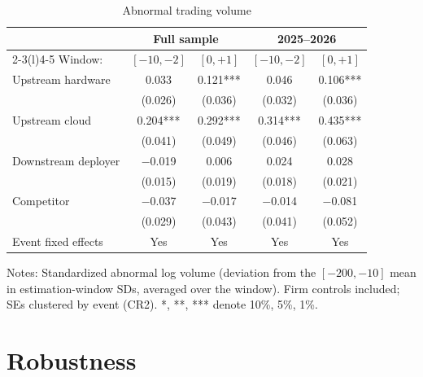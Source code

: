 \documentclass[review,12pt,authoryear]{elsarticle}
\begin{document}
\begin{table}[t!]
\centering
\begin{threeparttable}
\caption{Abnormal trading volume}\label{tab:volume}
\small
\begin{tabular}{lcc@{\hskip 2em}cc}
\toprule
 & \multicolumn{2}{c}{Full sample} & \multicolumn{2}{c}{2025--2026} \\
\cmidrule(lr){2-3}\cmidrule(l){4-5}
Window: & $[-10,-2]$ & $[0,+1]$ & $[-10,-2]$ & $[0,+1]$ \\
\midrule
Upstream hardware   & 0.033 & 0.121*** & 0.046 & 0.106*** \\
                    & (0.026) & (0.036) & (0.032) & (0.036) \\
Upstream cloud      & 0.204*** & 0.292*** & 0.314*** & 0.435*** \\
                    & (0.041) & (0.049) & (0.046) & (0.063) \\
Downstream deployer & $-$0.019 & 0.006 & 0.024 & 0.028 \\
                    & (0.015) & (0.019) & (0.018) & (0.021) \\
Competitor          & $-$0.037 & $-$0.017 & $-$0.014 & $-$0.081 \\
                    & (0.029) & (0.043) & (0.041) & (0.052) \\
\midrule
Event fixed effects & Yes & Yes & Yes & Yes \\
\bottomrule
\end{tabular}
\begin{tablenotes}\footnotesize
\item Notes: Standardized abnormal log volume (deviation from the
$[-200,-10]$ mean in estimation-window SDs, averaged over the window). Firm
controls included; SEs clustered by event (CR2). *, **, *** denote 10\%,
5\%, 1\%.
\end{tablenotes}
\end{threeparttable}
\end{table}

\section{Robustness}\label{sec:robust}
\end{document}
